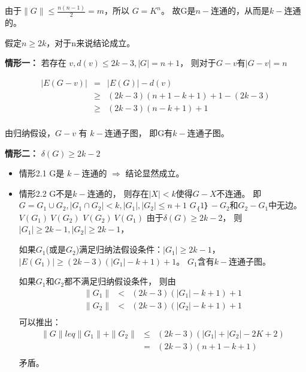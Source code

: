 \documentclass[UTF8]{ctexart}
\begin{document}
    由于$\| G \| \leq \frac{n(n-1)}{2} = m $，所以 $G = K^{n}$。
    故G是$n-$连通的，从而是$k-$连通的。
    
    假定$ n\geq 2k $，对于n来说结论成立。
    
    \textbf{情形一：}
    若存在 $v,  d(v) \leq 2k - 3 , |G| = n+1 $，
    则对于$G-v$有$|G-v|=n$
    
    \begin{eqnarray*}
    |E(G-v)| & =    & | E(G) | - d(v)  \\
             & \geq & ( 2k-3)( n+1-k+1 )+1-(2k-3) \\
             & \geq & ( 2k-3)( n-k+1 )+1 \\
    \end{eqnarray*}
    
    由归纳假设，$G-v$ 有 $k-$连通子图，
    即G有$ k-$连通子图。
    
    \textbf{情形二：}
    $ \delta(G) \geq 2k-2 $
    
    \begin{itemize}
    \item 情形2.1 G是 $k-$连通的 $\Longrightarrow$ 结论显然成立。
    \item 情形2.2 G不是$k-$连通的，
    则存在$|X| < k $使得$G-X$不连通。
    即$G = G_{1} \cup G_{2} , |G_{1} \cap G_{2}| < k, |G_{1}|,|G_{2}| \leq n+1 $
    $ G_｛1｝-G_{2}$和$G_{2} - G_{1}$中无边。
    $V(G_{1}) \ V(G_{2})$ $V(G_{2}) \ V(G_{1})$
    由于$ \delta(G) \geq 2k-2 $，
    则$|G_{1}| \geq 2k-1, |G_{2}| \geq 2k-1$，
    
    如果$G_{1}$(或是$G_{2}$)满足归纳法假设条件：$|G_{1}| \geq 2k-1 $，
    $|E(G_{1})| \geq (2k-3)(|G_{1}| - k + 1 ) + 1$。
    $G_{1}$含有$k-$连通子图。
    
    如果$G_{1}$和$G_{2}$都不满足归纳假设条件，
    则由
    \begin{eqnarray*}
    \| G_{1} \| & < & (2k-3)(|G_{1}| -k+1)+1   \\
    \| G_{2} \| & < & (2k-3)(|G_{2}|- k+1)+1  \\
    \end{eqnarray*}
    可以推出：
    \begin{eqnarray*}
    \| G \| leq \| G_{1} \| +  \| G_{2} \| & \leq & (2k-3)(|G_{1}| +|G_{2}| -2K+2 ) \\
                                           & =    & (2k-3)(n+1-k+1)\\
    \end{eqnarray*}
    矛盾。
    
    \end{itemize}
    
\end{document}
